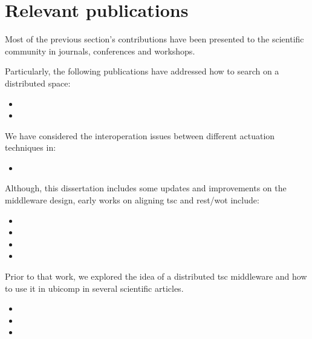 \section{Relevant publications}


Most of the previous section's contributions have been presented to the scientific community in journals, conferences and workshops.

\begin{sloppypar}

Particularly, the following publications have addressed how to search on a distributed space:
\begin{itemize}
 \item[] 
 \item[] 
\end{itemize}


We have considered the interoperation issues between different actuation techniques in:
\begin{itemize}
 \item[] 
\end{itemize}


Although, this dissertation includes some updates and improvements on the middleware design, early works on aligning \ac{tsc} and \ac{rest}/\ac{wot} include:
\begin{itemize}
 \item[] 
 \item[] 
 \item[] 
 \item[] 
\end{itemize}


Prior to that work, we explored the idea of a distributed \ac{tsc} middleware and how to use it in \ac{ubicomp} in several scientific articles. %
\begin{itemize}
 \item[] 
 \item[] 
 \item[] 
\end{itemize}



\end{sloppypar}
